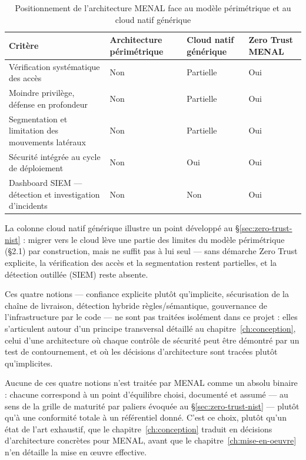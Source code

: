 \begin{table}[htbp]
\centering
\caption{Positionnement de l'architecture MENAL face au modèle périmétrique et au cloud natif générique}
\label{tab:positionnement-etat-art}
\begin{tabular}{@{}P{5.5cm}P{3cm}P{3cm}P{3.3cm}@{}}
\toprule
\textbf{Critère} & \textbf{Architecture périmétrique} & \textbf{Cloud natif générique} & \textbf{Zero Trust MENAL} \\
\midrule
Vérification systématique des accès & Non & Partielle & Oui \\
Moindre privilège, défense en profondeur & Non & Partielle & Oui \\
Segmentation et limitation des mouvements latéraux & Non & Partielle & Oui \\
Sécurité intégrée au cycle de déploiement & Non & Oui & Oui \\
Dashboard SIEM --- détection et investigation d'incidents & Non & Non & Oui \\
\bottomrule
\end{tabular}
\end{table}

La colonne \og cloud natif générique \fg{} illustre un point développé au
\S\ref{sec:zero-trust-nist} : migrer vers le cloud lève une partie des limites du modèle
périmétrique (§2.1) par construction, mais ne suffit pas à lui seul --- sans démarche Zero
Trust explicite, la vérification des accès et la segmentation restent partielles, et la
détection outillée (SIEM) reste absente.

Ces quatre notions --- confiance explicite plutôt qu'implicite, sécurisation de la chaîne de
livraison, détection hybride règles/sémantique, gouvernance de l'infrastructure par le code
--- ne sont pas traitées isolément dans ce projet : elles s'articulent autour d'un principe
transversal détaillé au chapitre~\ref{ch:conception}, celui d'une architecture où chaque
contrôle de sécurité peut être démontré par un test de contournement, et où les décisions
d'architecture sont tracées plutôt qu'implicites.

Aucune de ces quatre notions n'est traitée par MENAL comme un absolu binaire : chacune
correspond à un point d'équilibre choisi, documenté et assumé --- au sens de la grille de
maturité par paliers évoquée au \S\ref{sec:zero-trust-nist} --- plutôt qu'à une conformité
totale à un référentiel donné. C'est ce choix, plutôt qu'un état de l'art exhaustif, que le
chapitre~\ref{ch:conception} traduit en décisions d'architecture concrètes pour MENAL, avant
que le chapitre~\ref{ch:mise-en-oeuvre} n'en détaille la mise en œuvre effective.
